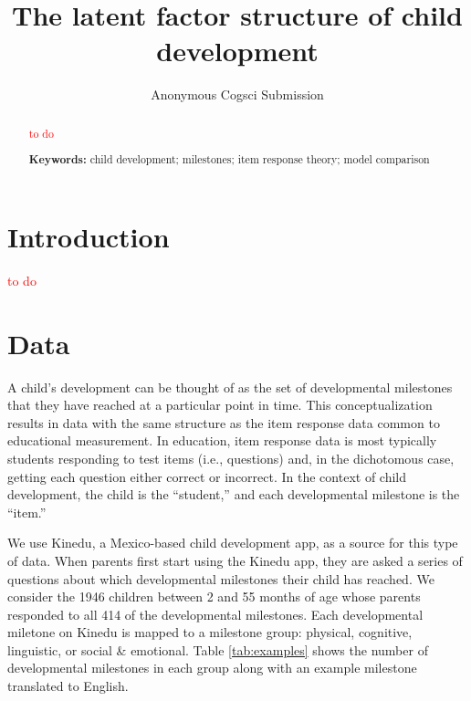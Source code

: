 \documentclass[10pt, letterpaper]{article}
\title{The latent factor structure of child development}
\author{Anonymous Cogsci Submission}
\newcommand\myworries[1]{\textcolor{red}{#1}}
\begin{document}
\maketitle

\begin{abstract}
\myworries{to do}

\textbf{Keywords:}
child development; milestones; item response theory; model comparison
\end{abstract}

\hypertarget{introduction}{%
\section{Introduction}\label{introduction}}

\textcolor{red}{to do}

\hypertarget{data}{%
\section{Data}\label{data}}

A child's development can be thought of as the set of developmental
milestones that they have reached at a particular point in time. This
conceptualization results in data with the same structure as the item
response data common to educational measurement. In education, item
response data is most typically students responding to test items (i.e.,
questions) and, in the dichotomous case, getting each question either
correct or incorrect. In the context of child development, the child is
the ``student,'' and each developmental milestone is the ``item.''

We use Kinedu, a Mexico-based child development app, as a source for
this type of data. When parents first start using the Kinedu app, they
are asked a series of questions about which developmental milestones
their child has reached. We consider the 1946 children between 2 and 55
months of age whose parents responded to all 414 of the developmental
milestones. Each developmental miletone on Kinedu is mapped to a
milestone group: physical, cognitive, linguistic, or social \&
emotional. Table \ref{tab:examples} shows the number of developmental
milestones in each group along with an example milestone translated to
English.
\end{document}
